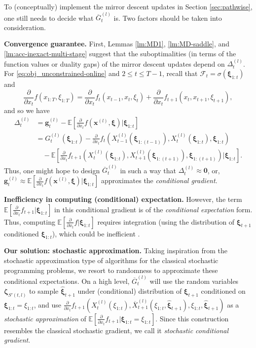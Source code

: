 \documentclass[11pt,fullpage,letterpaper]{article}
\newcommand{\mc}{\mathcal}
\newcommand{\mb}{\mathbf}
\newcommand{\E}{\mathbb{E}}
\newcommand{\bx}{\boldsymbol{\xi}}
\newcommand{\bz}{\boldsymbol{\zeta}}
\begin{document}
To (conceptually) implement the mirror descent updates in Section \ref{sec:pathwise}, one still needs to decide what $\overline{G}_t^{(l)}$ is. Two factors should be taken into consideration. 

\textbf{Convergence guarantee.} First, Lemmas \ref{lm:MD1}, \ref{lm:MD-saddle}, and \ref{lm:acc-inexact-multi-stage} suggest that the suboptimalities (in terms of the function values or duality gaps) of the mirror descent updates depend on $\Delta_t^{(l)}$. For \eqref{eq:obj_unconstrained-online} and $2\leq t\leq T-1$, recall that $\mc F_t = \sigma(\bx_{1:t})$ and
\begin{equation}\label{eq:grad-compute}
    \frac{\partial }{\partial x_t}f(x_{1:T},\xi_{1:T}) = \frac{\partial }{\partial x_t}f_{t}(x_{t-1},x_t,\xi_t) + \frac{\partial }{\partial x_t}f_{t+1}(x_{t},x_{t+1},\xi_{t+1}),
\end{equation}
and so we have
\begin{align*}
    \Delta^{(l)}_t&= \mb g^{(l)}_t-\E[\frac{\partial}{\partial x_t}f(\mb x^{(l)},\bx)|\bx_{1:t}] \\
    &= G_t^{(l)}(\bx_{1:t}) - \frac{\partial}{\partial x_t}f_t(X_{t-1}^{(l)}(\bx_{1:(t-1)}),X_{t}^{(l)}(\bx_{1:t}),\bx_{1:t})\\
    &\quad -\E[\frac{\partial}{\partial x_t}f_{t+1}(X_{t}^{(l)}(\bx_{1:t}),X_{t+1}^{(l)}(\bx_{1:(t+1)}),\bx_{1:(t+1)})|\bx_{1:t}].
\end{align*}
Thus, one might hope to design $\overline{G}_t^{(l)}$ in such a way that $\Delta_t^{(l)}\approx \mb 0$, or, $\mb g_t^{(l)}\approx\E[\frac{\partial}{\partial x_t}f(\mb x^{(l)},\bx)|\bx_{1:t}]$ approximates the \textit{conditional gradient}. 

\textbf{Inefficiency in computing (conditional) expectation.} However, the term $\E[\frac{\partial}{\partial x_t}f_{t+1}|\bx_{1:t}]$ in this conditional gradient is of the \textit{conditional expectation} form. Thus, computing $\E[\frac{\partial}{\partial x_t}f|\bx_{1:t}]$ requires integration (using the distribution of $\bx_{t+1}$ conditioned $\bx_{1:t}$), which could be inefficient \cite{NemirovskiRobustSA2009}. 

\textbf{Our solution: stochastic approximation.} Taking inspiration from the stochastic approximation type of algorithms for the classical stochastic programming problems, we resort to randomness to approximate these conditional expectations. On a high level, $\overline{G}_t^{(l)}$ will use the random variables $\bz_{S'(t,l)}$ to sample $\widehat{\bx}_{t+1}$ under (conditional) distribution of $\bx_{t+1}$ conditioned on $\bx_{1:t} = \xi_{1:t}$, and use $\frac{\partial}{\partial x_t}f_{t+1}(X_{t}^{(l)}(\xi_{1:t}),\overline{X}_{t+1}^{(l)}(\xi_{1:t},\widehat{\bx}_{t+1}),\xi_{1:t},\widehat{\bx}_{t+1})$ as a \textit{stochastic approximation} of $\E[\frac{\partial}{\partial x_t}f_{t+1}|\bx_{1:t} = \xi_{1:t}]$. Since this construction resembles the classical stochastic gradient, we call it \textit{stochastic conditional gradient}. 
\end{document}
